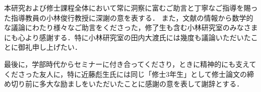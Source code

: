 本研究および修士課程全体において常に洞察に富むご助言と丁寧なご指導を賜った指導教員の小林俊行教授に深謝の意を表する．%
また，文献の情報から数学的な議論にわたり様々なご助言をくださった，修了生も含む小林研究室のみなさまにも心より感謝する．特に小林研究室の田内大渡氏には幾度も議論いただいたことに御礼申し上げたい．

最後に，学部時代からセミナーに付き合ってくださり，ときに精神的にも支えてくださった友人に，特に近藤彪生氏には同じ「修士3年生」として修士論文の締め切り前に多大な励ましをいただいたことに感謝の意を表して謝辞とする．
